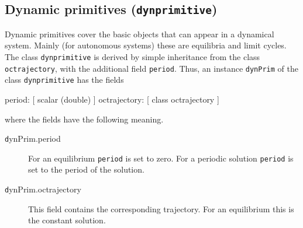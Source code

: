 \subsection{Dynamic primitives (\texorpdfstring{\lstinline+dynprimitive+}{dynprimitive})}
Dynamic primitives cover the basic objects that can appear in a dynamical system. Mainly (for autonomous systems) these are equilibria and limit cycles. The class \lstinline+dynprimitive+ is derived by simple inheritance from the class \lstinline+octrajectory+, with the additional field \lstinline+period+. Thus, an instance \lstinline+dynPrim+ of the class \lstinline+dynprimitive+ has the fields
\begin{matlab}
          period: [ scalar (double) ]
    octrajectory: [ class octrajectory ]
\end{matlab}
where the fields have the following meaning.
\begin{description}
	\item[\texttt dynPrim.period] For an equilibrium \lstinline+period+ is set to zero. For a periodic solution \lstinline+period+ is set to the period of the solution.
	\item[\texttt dynPrim.octrajectory] This field contains the corresponding trajectory. For an equilibrium this is the constant solution.
\end{description}
	